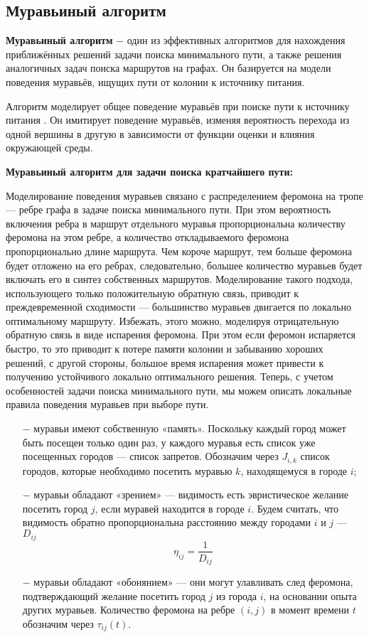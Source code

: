 \subsection{Муравьиный алгоритм}

\textbf{Муравьиный алгоритм} $-$ один из эффективных алгоритмов для нахождения приближённых решений задачи поиска минимального пути, а также решения аналогичных задач поиска маршрутов на графах. Он базируется на модели поведения муравьёв, ищущих пути от колонии к источнику питания.

Алгоритм моделирует общее поведение муравьёв при поиске пути к источнику питания \cite{ulyanov}. 
Он имитирует поведение муравьёв, изменяя вероятность перехода из одной вершины в другую в зависимости от функции оценки и влияния окружающей среды.

\textbf{Муравьиный алгоритм для задачи поиска кратчайшего пути:}

Моделирование поведения муравьев связано с распределением феромона на тропе — ребре графа в задаче поиска минимального пути. При этом вероятность включения ребра в маршрут отдельного муравья пропорциональна количеству феромона на этом ребре, а количество откладываемого феромона пропорционально длине маршрута. Чем короче маршрут, тем больше феромона будет отложено на его ребрах, следовательно, большее количество муравьев будет включать его в синтез собственных маршрутов. Моделирование такого подхода, использующего только положительную обратную связь, приводит к преждевременной сходимости — большинство муравьев двигается по локально оптимальному маршруту. Избежать, этого можно, моделируя отрицательную обратную связь в виде испарения феромона. При этом если феромон испаряется быстро, то это приводит к потере памяти колонии и забыванию хороших решений, с другой стороны, большое время испарения может привести к получению устойчивого локально оптимального решения. Теперь, с учетом особенностей задачи поиска минимального пути, мы можем описать локальные правила поведения муравьев при выборе пути.

\begin{itemize}
	\item[$-$] муравьи имеют собственную «память». Поскольку каждый город может быть посещеи только один раз, у каждого муравья есть список уже посещенных городов --- список запретов. Обозначим через $J_{i,k}$ список городов, которые необходимо посетить муравью $k$, находящемуся в городе $i$;
	\item[$-$] муравьи обладают «зрением» --- видимость есть эвристическое желание посетить город $j$, если муравей находится в городе $i$. Будем считать, что видимость обратно пропорциональна расстоянию между городами $i$ и $j$ --- $D_{ij}$ 
	\begin{equation}
	\label{eq:vision}
	\eta_{ij} = \frac{1}{D_{ij}}
	\end{equation}
	\item[$-$] муравьи обладают «обонянием» — они могут улавливать след феромона, подтверждающий желание посетить город $j$ из города $i$, на основании опыта других муравьев. Количество феромона на ребре $(i,j)$ в момент времени $t$ обозначим через $\tau_{ij}(t)$.
\end{itemize}


